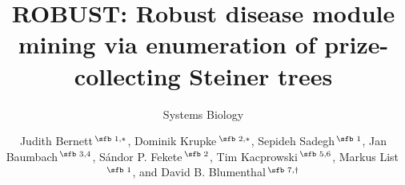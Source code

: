 \documentclass{bioinfo}
\begin{document}

\subtitle{Systems Biology}

\title[Robust disease module mining]{ROBUST: Robust disease module mining via enumeration of  prize-collecting Steiner trees} 
\author[Bernett \textit{et~al}.]{%
Judith Bernett\,$^{\text{\sfb 1,}*}$, %
Dominik Krupke\,$^{\text{\sfb 2,}*}$, %
Sepideh Sadegh\,$^{\text{\sfb 1}}$, %
Jan Baumbach\,$^{\text{\sfb 3,4}}$, %
S\'andor P. Fekete\,$^{\text{\sfb 2}}$, %
Tim Kacprowski\,$^{\text{\sfb 5,6}}$, %
Markus List\,$^{\text{\sfb 1}}$, %
and David B. Blumenthal\,$^{\text{\sfb 7,}\dagger}$}



\address{%
$^{\text{\sf 1}}$Chair of Experimental Bioinformatics, TUM School of Life Sciences, Technical University of Munich, Freising, Germany \\
$^{\text{\sf 2}}$Institute of Operating Systems and Computer Networks, Technical University of Brunswick, Brunswick, Germany\\
$^{\text{\sf 3}}$Chair of Computational Systems Biology, University of Hamburg, Hamburg, Germany\\
$^{\text{\sf 4}}$Department of Mathematics and Computer Science, University of Southern Denmark, Odense, Denmark\\
$^{\text{\sf 5}}$Division of Data Science in Biomedicine, Peter L. Reichertz Institute for Medical Informatics, Technical University of Brunswick and Hannover Medical School, Brunswick, Germany\\
$^{\text{\sf 6}}$Braunschweig Integrated Centre of Systems Biology (BRICS), Brunswick, Germany\\
$^{\text{\sf 7}}$Department Artificial Intelligence in Biomedical Engineering, Friedrich-Alexander University Erlangen-Nürnberg, Erlangen, Germany}


\end{document}
